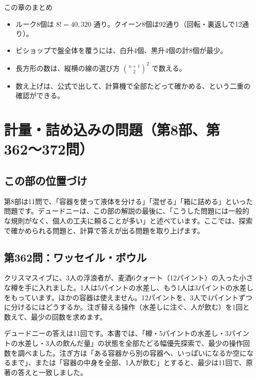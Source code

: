 \documentclass[a4paper,11pt,openany]{ltjsbook}
\begin{document}
\begin{pointbox}{この章のまとめ}
\begin{itemize}[leftmargin=*]
\item ルーク8個は $8!=40{,}320$ 通り。クイーン8個は92通り（回転・裏返しで12通り）。
\item ビショップで盤全体を覆うには、白升4個、黒升4個の計8個が最少。
\item 長方形の数は、縦横の線の選び方 $\binom{n+1}{2}^2$ で数える。
\item 数え上げは、公式で出して、計算機で全部たどって確かめる、という二重の確認ができる。
\end{itemize}
\end{pointbox}

\chapter{計量・詰め込みの問題（第8部、第362〜372問）}

\section{この部の位置づけ}

第8部は11問で、「容器を使って液体を分ける」「混ぜる」「箱に詰める」といった問題です。デュードニーは、この部の解説の最後に、「こうした問題には一般的な規則がなく、個人の工夫に頼ることが多い」と述べています。ここでは、探索で確かめられる問題と、計算で答えが出る問題を取り上げます。

\section{第362問：ワッセイル・ボウル}

クリスマスイブに、3人の浮浪者が、麦酒6クォート（12パイント）の入った小さな樽を手に入れました。1人は5パイントの水差し、もう1人は3パイントの水差しをもっています。ほかの容器は使えません。12パイントを、3人で4パイントずつに分けるにはどうするか。注ぎ替える操作（水差しに注ぐ、人が飲む）を1回と数えて、最少の回数を求めます。

デュードニーの答えは11回です。本書では、「樽・5パイントの水差し・3パイントの水差し・3人の飲んだ量」の状態を全部たどる幅優先探索で、最少の操作回数を調べました。注ぎ方は「ある容器から別の容器へ、いっぱいになるか空になるまで」、または「容器の中身を全部、1人が飲む」とすると、最少は11回で、原著の答えと一致しました。
\end{document}
